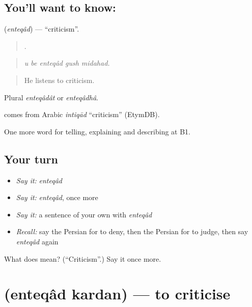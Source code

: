 \subsection*{You'll want to know: }
\textbf{} (\emph{enteqâd}) — \textquotedblleft{}criticism\textquotedblright{}.

\begin{quote}
    .
\end{quote}

\begin{quote}
\emph{u be enteqâd gush midahad.}
\end{quote}

\begin{quote}
He listens to criticism.
\end{quote}

Plural \emph{enteqâdât} or \emph{enteqâdhâ}.

\begin{cousinweb}
\textbf{} comes from Arabic \emph{intiqād} \textquotedblleft{}criticism\textquotedblright{} (EtymDB).
\end{cousinweb}

\begin{grammarlens}[title={What you've built}]
One more word for telling, explaining and describing at B1.
\end{grammarlens}

\subsection*{Your turn}
\begin{itemize}
\raggedright
  \item \emph{Say it:} \emph{enteqâd}
  \item \emph{Say it:} \emph{enteqâd}, once more
  \item \emph{Say it:} a sentence of your own with \emph{enteqâd}
  \item \emph{Recall:} say the Persian for to deny, then the Persian for to judge, then say \emph{enteqâd} again
\end{itemize}

\begin{tcolorbox}[breakable,colback=teal!4,colframe=teal!35!black,title={Before you move on}]
What does  mean? (\textquotedblleft{}Criticism\textquotedblright{}.) Say it once more.
\end{tcolorbox}
\section[\texorpdfstring{\fa{انتقاد} \fa{کردن} (enteqâd kardan)}{انتقاد کردن (enteqâd kardan)}]{  (enteqâd kardan) — to criticise}

